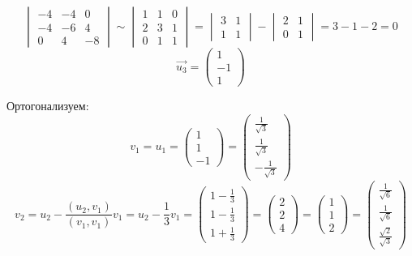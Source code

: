 \begin{itemize}
    $$
    \begin{vmatrix}
    	-4 & -4 & 0 \\
        -4 & -6 & 4 \\
        0 & 4 & -8
    \end{vmatrix} \sim
    \begin{vmatrix}
    	1 & 1 & 0 \\
        2 & 3 & 1 \\
        0 & 1 & 1
    \end{vmatrix} =
    \begin{vmatrix}
    	3 & 1 \\
        1 & 1
    \end{vmatrix} -
    \begin{vmatrix}
    	2 & 1 \\
        0 & 1
    \end{vmatrix} = 3 - 1 - 2 = 0 $$
    $$ \vec{u_3} =
    \begin{pmatrix}
    	1 \\
        -1 \\
        1
    \end{pmatrix} $$
\end{itemize}
Ортогонализуем:
$$ v_1 = u_1 =
\begin{pmatrix}
	1 \\
    1 \\
    -1
\end{pmatrix} =
\begin{pmatrix}
    \frac1{\sqrt3} \\
    \frac1{\sqrt3} \\
    -\frac1{\sqrt3}
\end{pmatrix} $$
$$ v_2 = u_2 - \frac{(u_2, v_1)}{(v_1, v_1)}v_1 = u_2 - \frac13v_1 =
\begin{pmatrix}
	1 - \frac13 \\
    1 - \frac13 \\
    1 + \frac13
\end{pmatrix} =
\begin{pmatrix}
	2 \\
    2 \\
    4
\end{pmatrix} =
\begin{pmatrix}
	1 \\
    1 \\
    2
\end{pmatrix} =
\begin{pmatrix}
    \frac1{\sqrt6} \\
    \frac1{\sqrt6} \\
    \frac{\sqrt2}{\sqrt3}
\end{pmatrix} $$
